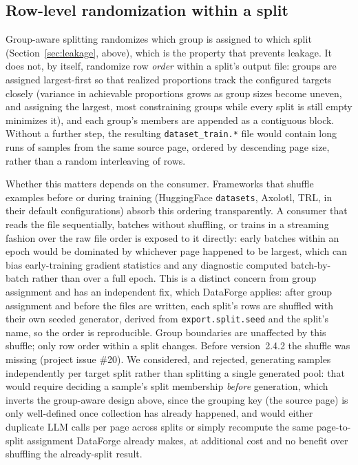 \documentclass[11pt]{article}
\begin{document}
\subsection{Row-level randomization within a split}
\label{sec:row-shuffle}
Group-aware splitting randomizes which group is assigned to which split
(Section~\ref{sec:leakage}, above), which is the property
that prevents leakage. It does not, by itself, randomize row
\emph{order} within a split's output file: groups are assigned
largest-first so that realized proportions track the configured targets
closely (variance in achievable proportions grows as group sizes become
uneven, and assigning the largest, most constraining groups while every
split is still empty minimizes it), and each group's members are
appended as a contiguous block. Without a further step, the resulting
\texttt{dataset\_train.*} file would contain long runs of samples from
the same source page, ordered by descending page size, rather than a
random interleaving of rows.

Whether this matters depends on the consumer. Frameworks that shuffle
examples before or during training (HuggingFace \texttt{datasets},
Axolotl, TRL, in their default configurations) absorb this ordering
transparently. A consumer that reads the file sequentially, batches
without shuffling, or trains in a streaming fashion over the raw file
order is exposed to it directly: early batches within an epoch would be
dominated by whichever page happened to be largest, which can bias
early-training gradient statistics and any diagnostic computed
batch-by-batch rather than over a full epoch. This is a distinct concern
from group assignment and has an independent fix, which DataForge
applies: after group assignment and before the files are written, each
split's rows are shuffled with their own seeded generator, derived from
\texttt{export.split.seed} and the split's name, so the order is
reproducible. Group boundaries are unaffected by this shuffle; only row
order within a split changes. Before version~2.4.2 the shuffle was
missing (project issue \#20). We considered, and rejected, generating samples
independently per target split rather than splitting a single generated
pool: that would require deciding a sample's split membership
\emph{before} generation, which inverts the group-aware design above,
since the grouping key (the source page) is only well-defined once
collection has already happened, and would either duplicate LLM calls
per page across splits or simply recompute the same page-to-split
assignment DataForge already makes, at additional cost and no benefit
over shuffling the already-split result.
\end{document}
